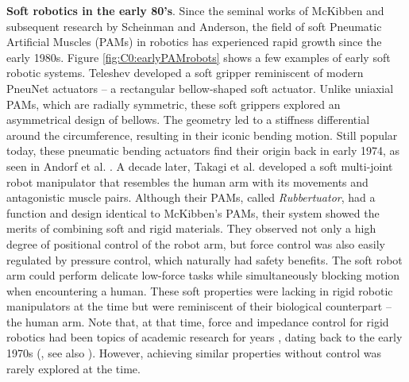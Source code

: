 \textbf{Soft robotics in the early 80's}. Since the seminal works of McKibben and subsequent research by Scheinman and Anderson, the field of soft Pneumatic Artificial Muscles (PAMs) in robotics has experienced rapid growth since the early 1980s. Figure \ref{fig:C0:earlyPAMrobots} shows a few examples of early soft robotic systems. Teleshev \cite{Teleshev1981} developed a soft gripper reminiscent of modern PneuNet actuators \cite{Galloway2016,Mosadegh2014,Choi2011} -- a rectangular bellow-shaped soft actuator. Unlike uniaxial PAMs, which are radially symmetric, these soft grippers explored an asymmetrical design of bellows. The geometry led to a stiffness differential around the circumference, resulting in their iconic bending motion. Still popular today, these pneumatic bending actuators find their origin back in early 1974, as seen in Andorf et al. \cite{Andorf1974}. A decade later, Takagi et al. \cite{Takagi1983} developed a soft multi-joint robot manipulator that resembles the human arm with its movements and antagonistic muscle pairs. Although their PAMs, called \textit{Rubbertuator}, had a function and design identical to McKibben's PAMs, their system showed the merits of combining soft and rigid materials. They observed not only a high degree of positional control of the robot arm, but force control was also easily regulated by pressure control, which naturally had safety benefits. The soft robot arm could perform delicate low-force tasks while simultaneously blocking motion when encountering a human. These soft properties were lacking in rigid robotic manipulators at the time but were reminiscent of their biological counterpart -- the human arm. Note that, at that time, force and impedance control for rigid robotics had been topics of academic research for years \cite{Anderson1988,Khatib1987,Hogan1984,Hogan1984Jan}, dating back to the early 1970s (\eg, see also \cite{Markiewicz1973}). However, achieving similar properties without control was rarely explored at the time.
%
